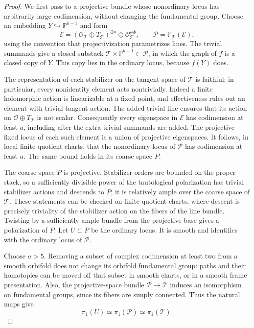 \documentclass[11pt,reqno]{amsart}
\numberwithin{equation}{section}
\theoremstyle{definition}
\theoremstyle{remark}
\begin{document}
\begin{proof}
We first pass to a projective bundle whose nonordinary locus has
arbitrarily large codimension, without changing the fundamental group.
Choose an embedding $Y\hookrightarrow\mathbb P^{b-1}$ and form
\[
 \mathcal E=(\mathcal O_{\mathcal T}\oplus T_{\mathcal T})^{\oplus a}
                 \oplus\mathcal O_{\mathcal T}^{\oplus b},
 \qquad \mathcal P=\mathbb P_{\mathcal T}(\mathcal E),
\]
using the convention that projectivization parametrizes lines.  The
trivial summands give a closed substack
$\mathcal T\times\mathbb P^{b-1}\subset\mathcal P$, in which the graph of
$f$ is a closed copy of $Y$.  This copy lies in the ordinary locus,
because $f(Y)$ does.

The representation of each stabilizer on the tangent space of
$\mathcal T$ is faithful; in particular, every nonidentity element acts
nontrivially.  Indeed a finite holomorphic action is linearizable at a
fixed point, and effectiveness rules out an element with trivial tangent
action.  The added trivial line ensures
that its action on $\mathcal O\oplus T_{\mathcal T}$ is not scalar.
Consequently every eigenspace in $\mathcal E$ has codimension at least
$a$, including after the extra trivial summands are added.  The
projective fixed locus of each such element is a union of projective
eigenspaces.  It follows, in local finite quotient charts, that the
nonordinary locus of $\mathcal P$ has codimension at least $a$.
The same bound holds in its coarse space $P$.

The coarse space $P$ is projective.  Stabilizer orders are bounded on
the proper stack, so a sufficiently divisible power of the tautological
polarization has trivial stabilizer actions and
descends to $P$; it is relatively ample over the coarse space of
$\mathcal T$.  These statements can be checked on finite quotient
charts, where descent is precisely triviality of the stabilizer action
on the fibers of the line bundle.  Twisting by a sufficiently ample
bundle from the projective base gives a polarization of $P$.
Let $U\subset P$ be the ordinary locus.  It is smooth and identifies
with the ordinary locus of $\mathcal P$.

Choose $a>5$.  Removing a subset of complex codimension at least two
from a smooth orbifold does not change its orbifold fundamental group:
paths and their homotopies can be moved off that subset in smooth
charts, or in a smooth frame presentation.  Also, the projective-space
bundle $\mathcal P\to\mathcal T$ induces an isomorphism on fundamental
groups, since its fibers are simply connected.  Thus the natural maps
give
\begin{equation}\label{proj:ordinary-group}
 \pi_1(U)\simeq\pi_1(\mathcal P)\simeq\pi_1(\mathcal T).
\end{equation}


\end{proof}
\end{document}
